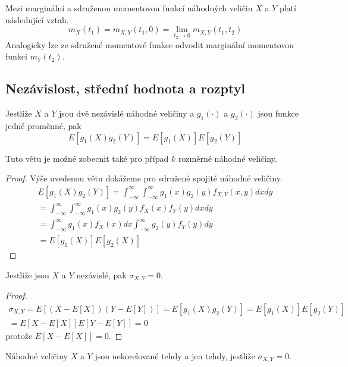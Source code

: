 Mezi marginální a sdruženou momentovou funkcí náhodných veličin $X$ a $Y$ platí následující vztah.
\begin{equation*}
m_X(t_1) = m_{X,Y}(t_1,0) = \lim_{t_2 \rightarrow 0} m_{X,Y}(t_1, t_2)
\end{equation*}
Analogicky lze ze sdružené momentové funkce odvodit marginální momentovou funkci $m_Y(t_2)$.

\subsection{Nezávislost, střední hodnota a rozptyl}

\begin{theorem}
Jestliže $X$ a $Y$ jsou dvě nezávislé náhodné veličiny a $g_1(\cdot)$ a $g_2(\cdot)$ jsou funkce jedné proměnné, pak
\begin{equation*}
E[g_1(X)g_2(Y)] = E[g_1(X)]E[g_2(Y)]
\end{equation*}
\end{theorem}

Tuto větu je možné zobecnit také pro případ $k$ rozměrné náhodné veličiny.

\begin{proof}
Výše uvedenou větu dokážeme pro sdružené spojité náhodné veličiny.
\begin{gather*}
E[g_1(X) g_2(Y)] = \int_{-\infty}^{\infty} \int_{-\infty}^{\infty} g_1(x)g_2(y)f_{X,Y}(x,y)dxdy\\
= \int_{-\infty}^{\infty} \int_{-\infty}^{\infty} g_1(x)g_2(y)f_X(x)f_Y(y)dxdy\\
= \int_{-\infty}^{\infty} g_1(x)f_X(x)dx \int_{-\infty}^{\infty} g_2(y)f_Y(y)dy\\
= E[g_1(X)]E[g_2(X)] 
\end{gather*}
\end{proof}

\begin{corollary}
Jestliže jsou $X$ a $Y$ nezávislé, pak $\sigma_{X,Y} = 0$.
\end{corollary}

\begin{proof}
\begin{gather*}
\sigma_{X,Y} = E[(X - E[X])(Y - E[Y])] = E[g_1(X)g_2(Y)] = E[g_1(X)]E[g_2(Y)]\\
= E[X - E[X]]E[Y - E[Y]] = 0
\end{gather*}
protože $E[X - E[X]] = 0$.
\end{proof}

\begin{definition}
Náhodné veličiny $X$ a $Y$ jsou nekorelované tehdy a jen tehdy, jestliže $\sigma_{X,Y} = 0$.
\end{definition}

